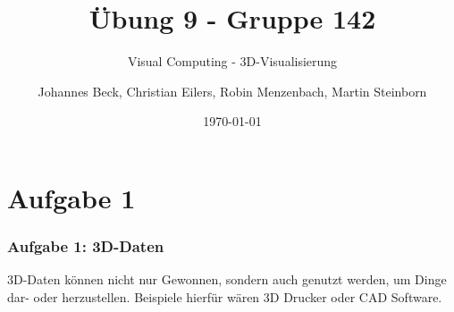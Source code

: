 \documentclass[accentcolor=tud9c,colorbacktitle,inverttitle,landscape,german,presentation,t]{tudbeamer}
\begin{document}
\title{\"Ubung 9 - Gruppe 142}
\subtitle{Visual Computing - 3D-Visualisierung}

\author[Johannes Beck, Christian Eilers, Robin Menzenbach, Martin Steinborn]{Johannes Beck, Christian Eilers, Robin Menzenbach, Martin Steinborn}


\date{\today}

\begin{titleframe}
\end{titleframe}

\section{Aufgabe 1}
	\begin{frame}
		\frametitle{Aufgabe 1: 3D-Daten}
		3D-Daten können nicht nur Gewonnen, sondern auch genutzt werden, um Dinge dar- oder herzustellen. Beispiele hierfür wären 3D Drucker oder CAD Software.
		
	\end{frame}
\end{document}
